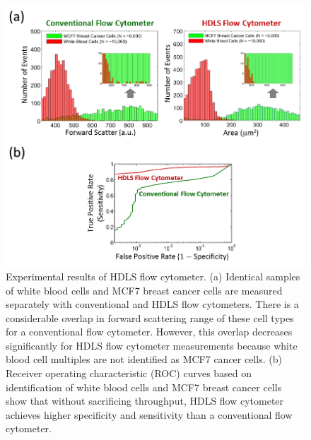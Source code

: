 \begin{figure}[htb!]
\centering
\includegraphics[scale=0.95]{PW2013/Figure8.png}
\caption{Experimental results of HDLS flow cytometer. (a) Identical samples of white blood cells and MCF7 breast cancer cells are measured separately with conventional and HDLS flow cytometers. There is a considerable overlap in forward scattering range of these cell types for a conventional flow cytometer. However, this overlap decreases significantly for HDLS flow cytometer measurements because white blood cell multiples are not identified as MCF7 cancer cells. (b) Receiver operating characteristic (ROC) curves based on identification of white blood cells and MCF7 breast cancer cells show that without sacrificing throughput, HDLS flow cytometer achieves higher specificity and sensitivity than a conventional flow cytometer.}
\label{fig:PW2013_Figure8}
\end{figure}
